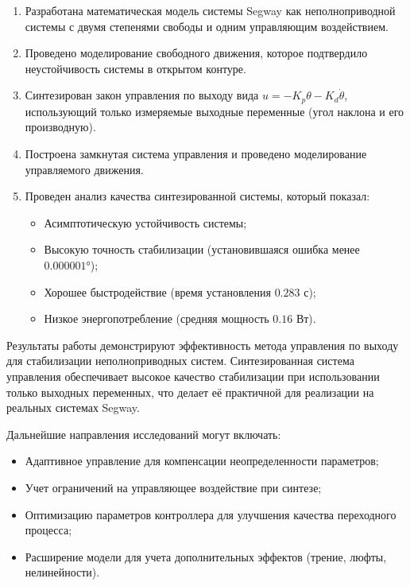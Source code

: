 \begin{enumerate}
    \item Разработана математическая модель системы Segway как неполноприводной системы с двумя степенями свободы и одним управляющим воздействием.
    
    \item Проведено моделирование свободного движения, которое подтвердило неустойчивость системы в открытом контуре.
    
    \item Синтезирован закон управления по выходу вида $u = -K_p \theta - K_d \dot{\theta}$, использующий только измеряемые выходные переменные (угол наклона и его производную).
    
    \item Построена замкнутая система управления и проведено моделирование управляемого движения.
    
    \item Проведен анализ качества синтезированной системы, который показал:
    \begin{itemize}
        \item Асимптотическую устойчивость системы;
        \item Высокую точность стабилизации (установившаяся ошибка менее $0.000001°$);
        \item Хорошее быстродействие (время установления $0.283$ с);
        \item Низкое энергопотребление (средняя мощность $0.16$ Вт).
    \end{itemize}
\end{enumerate}

Результаты работы демонстрируют эффективность метода управления по выходу для стабилизации неполноприводных систем. Синтезированная система управления обеспечивает высокое качество стабилизации при использовании только выходных переменных, что делает её практичной для реализации на реальных системах Segway.

Дальнейшие направления исследований могут включать:
\begin{itemize}
    \item Адаптивное управление для компенсации неопределенности параметров;
    \item Учет ограничений на управляющее воздействие при синтезе;
    \item Оптимизацию параметров контроллера для улучшения качества переходного процесса;
    \item Расширение модели для учета дополнительных эффектов (трение, люфты, нелинейности).
\end{itemize}


